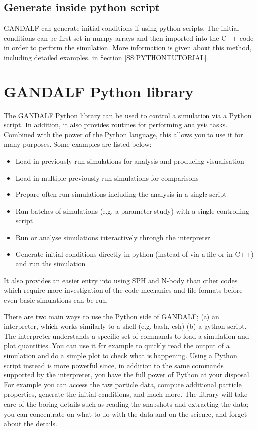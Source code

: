 \documentclass[a4paper]{article}
\begin{document}
\subsection{Generate inside python script}
GANDALF can generate initial conditions if using python scripts.  The initial conditions can be first set in numpy arrays and then imported into the C++ code in order to perform the simulation.  More information is given about this method, including detailed examples, in Section \ref{SS:PYTHONTUTORIAL}.


\newpage



\section{GANDALF Python library} \label{S:PYTHONSCRIPT}

The GANDALF Python library can be used to control a simulation via a Python script. In addition, it also provides routines for performing analysis tasks. Combined with the power of the Python language, this allows you to use it for many purposes. Some examples are listed below:
\begin{itemize}
\item Load in previously run simulations for analysis and producing visualisation
\item Load in multiple previously run simulations for comparisons
\item Prepare often-run simulations including the analysis in a single script
\item Run batches of simulations (e.g. a parameter study) with a single controlling script
\item Run or analyse simulations interactively through the interpreter
\item Generate initial conditions directly in python (instead of via a file or in C++) and run the simulation
\end{itemize}
It also provides an easier entry into using SPH and N-body than other codes which require more investigation of the code mechanics and file formats before even basic simulations can be run.

There are two main ways to use the Python side of GANDALF; (a) an interpreter, which works similarly to a shell (e.g. bash, csh) (b) a python script.  The interpreter understands a specific set of commands to load a simulation and plot quantities. You can use it for example to quickly read the output of a simulation and do a simple plot to check what is happening. Using a Python script instead is more powerful since, in addition to the same commands supported by the interpreter, you have the full power of Python at your disposal. For example you can access the raw particle data, compute additional particle properties, generate the initial conditions, and much more. The library will take care of the boring details such as reading the snapshots and extracting the data; you can concentrate on what to do with the data and on the science, and forget about the details.
\end{document}
